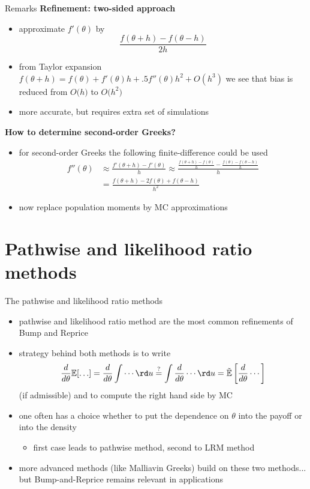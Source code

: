 \documentclass[pdf, handout]{beamer}
\begin{document}
\begin{frame}{Remarks}
\textbf{Refinement: two-sided approach}
\begin{itemize}
\item  
approximate $f'(\theta)$ by 
\[
\frac{f(\theta+h) - f(\theta -h)    }{2h}  
\]
\item from Taylor expansion $f(\theta+h)=f(\theta) + f'(\theta)h
+.5f''(\theta)h^2 + O(h^3)$  we see that bias is reduced
from  $O\big(h\big)$ to $O\big(h^2\big)$
\item  more accurate, but 
requires extra set of simulations
\end{itemize}
\textbf{How to determine second-order Greeks?}
\begin{itemize}
\item for second-order Greeks the following finite-difference could be used
\begin{align*}
f''(\theta) &\approx 
\frac{ f'(\theta+h)  - f'(\theta)}{h}\approx
\frac{\frac{ f(\theta+h) -f(\theta)}{h} - 
\frac{ f(\theta) -f(\theta-h)}{h}
}{h}\\
&
= \frac{f(\theta+h) - 2f(\theta) + f(\theta-h) }{h^2}
\end{align*}
\item now  replace population moments by MC approximations
\end{itemize}
\end{frame}

\section{Pathwise and likelihood ratio methods}


\begin{frame}{The pathwise and likelihood ratio methods}
\begin{itemize}
\item
pathwise and likelihood ratio method are the most common refinements of Bump and Reprice
\item strategy behind both methods is to write
\[
\frac{d}{d\theta} \mathbb{E}[\ldots] =
\frac{d}{d\theta} \int \cdots  \rd u
\stackrel{?}{=} \int \frac{d}{d\theta}\cdots   \rd u
=  \tilde{\mathbb{E}}\left[\frac{d}{d\theta} \cdots\right]
\]
(if admissible) and to compute the right hand side by MC
\item one often has a choice whether to put the dependence on $\theta$ into the payoff or into the density
\begin{itemize}
\item
 first case leads to pathwise method,  second to  LRM method
 \end{itemize} 
\item more advanced methods (like Malliavin Greeks) build on these two methods... but Bump-and-Reprice remains relevant in applications
\end{itemize}
\end{frame}
\end{document}
